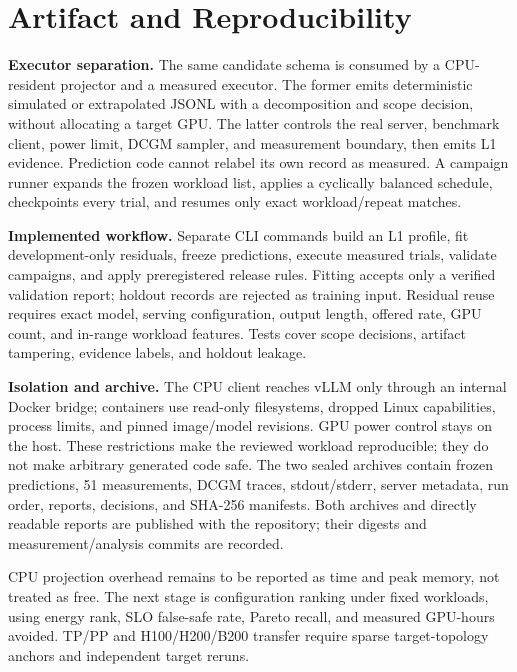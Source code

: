 \section{Artifact and Reproducibility}

\textbf{Executor separation.}  The same candidate schema is consumed by a
CPU-resident projector and a measured executor.  The former emits deterministic
simulated or extrapolated JSONL with a decomposition and scope decision, without
allocating a target GPU.  The latter controls the real server, benchmark client,
power limit, DCGM sampler, and measurement boundary, then emits L1 evidence.
Prediction code cannot relabel its own record as measured.  A campaign runner
expands the frozen workload list,
applies a cyclically balanced schedule, checkpoints every trial, and resumes
only exact workload/repeat matches.

\textbf{Implemented workflow.}  Separate CLI commands build an L1 profile,
fit development-only residuals, freeze predictions, execute measured trials,
validate campaigns, and apply preregistered release rules.  Fitting accepts
only a verified validation report; holdout records are rejected as training
input.  Residual reuse requires exact model, serving configuration, output
length, offered rate, GPU count, and in-range workload features.  Tests cover
scope decisions, artifact tampering, evidence labels, and holdout leakage.

\textbf{Isolation and archive.}  The CPU client reaches vLLM only through an
internal Docker bridge; containers use read-only filesystems, dropped Linux
capabilities, process limits, and pinned image/model revisions.  GPU power
control stays on the host.  These restrictions make the reviewed workload
reproducible; they do not make arbitrary generated code safe.  The two sealed
archives contain frozen predictions, 51 measurements, DCGM traces,
stdout/stderr, server metadata, run order, reports, decisions, and SHA-256
manifests.  Both archives and directly readable reports are published with the
repository; their digests and measurement/analysis commits are recorded.

CPU projection overhead remains to be reported as time and peak memory, not
treated as free.  The next stage is configuration ranking under fixed
workloads, using energy rank, SLO false-safe rate, Pareto recall, and measured
GPU-hours avoided.  TP/PP and H100/H200/B200 transfer require sparse
target-topology anchors and independent target reruns.
